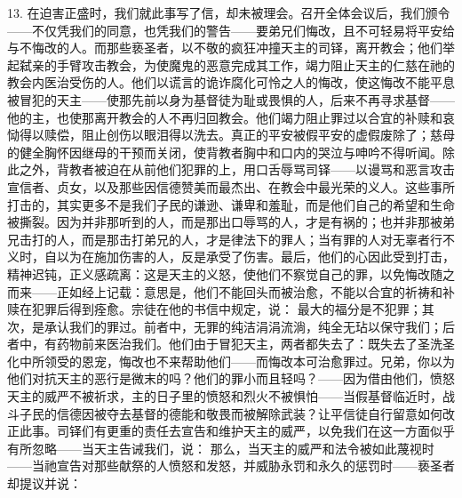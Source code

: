 13. 在迫害正盛时，我们就此事写了信，却未被理会。召开全体会议后，我们颁令——不仅凭我们的同意，也凭我们的警告——要弟兄们悔改，且不可轻易将平安给与不悔改的人。而那些亵圣者，以不敬的疯狂冲撞天主的司铎，离开教会；他们举起弑亲的手臂攻击教会，为使魔鬼的恶意完成其工作，竭力阻止天主的仁慈在祂的教会内医治受伤的人。他们以谎言的诡诈腐化可怜之人的悔改，使这悔改不能平息被冒犯的天主——使那先前以身为基督徒为耻或畏惧的人，后来不再寻求基督——他的主，也使那离开教会的人不再归回教会。他们竭力阻止罪过以合宜的补赎和哀恸得以赎偿，阻止创伤以眼泪得以洗去。真正的平安被假平安的虚假废除了；慈母的健全胸怀因继母的干预而关闭，使背教者胸中和口内的哭泣与呻吟不得听闻。除此之外，背教者被迫在从前他们犯罪的上，用口舌辱骂司铎——以谩骂和恶言攻击宣信者、贞女，以及那些因信德赞美而最杰出、在教会中最光荣的义人。这些事所打击的，其实更多不是我们子民的谦逊、谦卑和羞耻，而是他们自己的希望和生命被撕裂。因为并非那听到的人，而是那出口辱骂的人，才是有祸的；也并非那被弟兄击打的人，而是那击打弟兄的人，才是律法下的罪人；当有罪的人对无辜者行不义时，自以为在施加伤害的人，反是承受了伤害。最后，他们的心因此受到打击，精神迟钝，正义感疏离：这是天主的义怒，使他们不察觉自己的罪，以免悔改随之而来——正如经上记载：意思是，他们不能回头而被治愈，不能以合宜的祈祷和补赎在犯罪后得到痊愈。宗徒在他的书信中规定，说： 最大的福分是不犯罪；其次，是承认我们的罪过。前者中，无罪的纯洁涓涓流淌，纯全无玷以保守我们；后者中，有药物前来医治我们。他们由于冒犯天主，两者都失去了：既失去了圣洗圣化中所领受的恩宠，悔改也不来帮助他们——而悔改本可治愈罪过。兄弟，你以为他们对抗天主的恶行是微末的吗？他们的罪小而且轻吗？——因为借由他们，愤怒天主的威严不被祈求，主的日子里的愤怒和烈火不被惧怕——当假基督临近时，战斗子民的信德因被夺去基督的德能和敬畏而被解除武装？让平信徒自行留意如何改正此事。司铎们有更重的责任去宣告和维护天主的威严，以免我们在这一方面似乎有所忽略——当天主告诫我们，说： 那么，当天主的威严和法令被如此蔑视时——当祂宣告对那些献祭的人愤怒和发怒，并威胁永罚和永久的惩罚时——亵圣者却提议并说：\par

